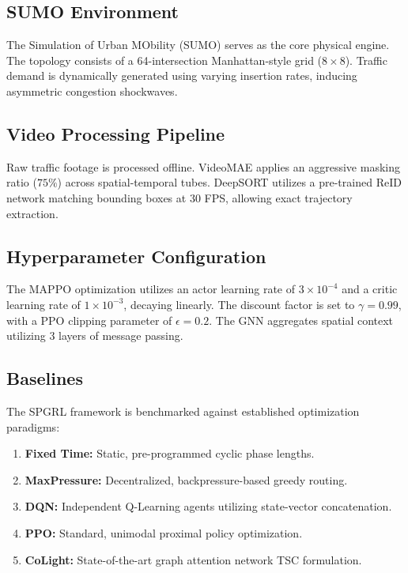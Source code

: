 \documentclass[journal]{IEEEtran}
\begin{document}
\subsection{SUMO Environment}
The Simulation of Urban MObility (SUMO) serves as the core physical engine. The topology consists of a 64-intersection Manhattan-style grid ($8 \times 8$). Traffic demand is dynamically generated using varying insertion rates, inducing asymmetric congestion shockwaves.

\subsection{Video Processing Pipeline}
Raw traffic footage is processed offline. VideoMAE applies an aggressive masking ratio ($75\%$) across spatial-temporal tubes. DeepSORT utilizes a pre-trained ReID network matching bounding boxes at 30 FPS, allowing exact trajectory extraction.

\subsection{Hyperparameter Configuration}
\label{subsec:hyperparameters}
The MAPPO optimization utilizes an actor learning rate of $3 \times 10^{-4}$ and a critic learning rate of $1 \times 10^{-3}$, decaying linearly. The discount factor is set to $\gamma = 0.99$, with a PPO clipping parameter of $\epsilon = 0.2$. The GNN aggregates spatial context utilizing 3 layers of message passing.

\subsection{Baselines}
The SPGRL framework is benchmarked against established optimization paradigms:
\begin{enumerate}
    \item \textbf{Fixed Time:} Static, pre-programmed cyclic phase lengths.
    \item \textbf{MaxPressure:} Decentralized, backpressure-based greedy routing.
    \item \textbf{DQN:} Independent Q-Learning agents utilizing state-vector concatenation.
    \item \textbf{PPO:} Standard, unimodal proximal policy optimization.
    \item \textbf{CoLight:} State-of-the-art graph attention network TSC formulation.
\end{enumerate}
\end{document}
